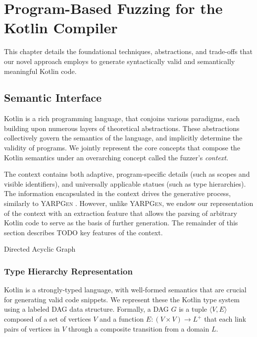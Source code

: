 \chapter{\label{cha:algorithm} Program-Based Fuzzing for the Kotlin Compiler}

This chapter details the foundational techniques, abstractions,
and trade-offs that our novel approach employs to generate syntactically
valid and semantically meaningful Kotlin code.

\section{\label{sec:context}Semantic Interface}

Kotlin is a rich programming language, that conjoins various
paradigms, each building upon numerous layers of
theoretical abstractions.
These abstractions collectively govern the semantics
of the language, and implicitly determine the validity of programs.
We jointly represent the core concepts that compose the Kotlin
semantics under an overarching concept called the fuzzer's \textit{context}.

The context contains both adaptive, program-specific details (such as scopes and
visible identifiers), and universally applicable statues (such as type hierarchies).
The information encapsulated in the context drives the generative
process, similarly to \textsc{YARPGen} \cite{manes2019art}.
However, unlike \textsc{YARPGen}, we endow our representation of the context
with an extraction feature that allows the parsing of arbitrary
Kotlin code to serve as the basis of further generation. 
The remainder of this section describes TODO key features of the context.

 {Directed Acyclic Graph}

\subsection{\label{subsec:type-hierarchy}Type Hierarchy Representation}

Kotlin is a strongly-typed language, with well-formed semantics
that are crucial for generating valid code snippets.
We represent these the Kotlin type system using a labeled \Gls{DAG} data structure.
Formally, a \Gls{DAG} $G$ is a tuple $\langle V, E \rangle$ composed
of a set of vertices $V$ and a function $E : (V \times V) \to L^{+}$ that
each link pairs of vertices in $V$ through a composite transition from a domain $L$.

